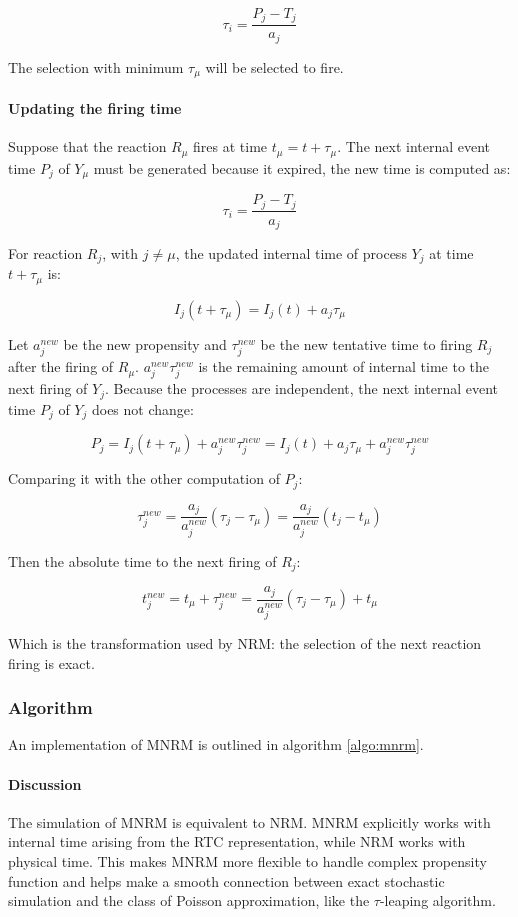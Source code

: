       $$\tau_i = \frac{P_j-T_j}{a_j}$$

      The selection with minimum $\tau_\mu$ will be selected to fire.

      \paragraph{Updating the firing time}
      Suppose that the reaction $R_\mu$ fires at time $t_\mu = t+\tau_\mu$.
      The next internal event time $P_j$ of $Y_\mu$ must be generated because it expired, the new time is computed as:

      $$\tau_i = \frac{P_j-T_j}{a_j}$$

      For reaction $R_j$, with $j\neq\mu$, the updated internal time of process $Y_j$ at time $t+\tau_\mu$ is:

      $$I_j(t+\tau_\mu) = I_j(t) + a_j\tau_\mu$$

      Let $a_j^{new}$ be the new propensity and $\tau_j^{new}$ be the new tentative time to firing $R_j$ after the firing of $R_\mu$.
      $a_j^{new}\tau_j^{new}$ is the remaining amount of internal time to the next firing of $Y_j$.
      Because the processes are independent, the next internal event time $P_j$ of $Y_j$ does not change:

      $$P_j = I_j(t+\tau_\mu) + a_j^{new}\tau_j^{new} = I_j(t) + a_j\tau_\mu + a_j^{new}\tau_j^{new}$$

      Comparing it with the other computation of $P_j$:

      $$\tau_j^{new} = \frac{a_j}{a_j^{new}}(\tau_j-\tau_\mu) = \frac{a_j}{a_j^{new}}(t_j-t_\mu)$$

      Then the absolute time to the next firing of $R_j$:

      $$t_j^{new} = t_\mu + \tau_j^{new} = \frac{a_j}{a_j^{new}}(\tau_j-\tau_\mu)+t_\mu$$

      Which is the transformation used by NRM: the selection of the next reaction firing is exact.

    \subsubsection{Algorithm}
    An implementation of MNRM is outlined in algorithm \ref{algo:mnrm}.

    

      \paragraph{Discussion}
      The simulation of MNRM is equivalent to NRM.
      MNRM explicitly works with internal time arising from the RTC representation, while NRM works with physical time.
      This makes MNRM more flexible to handle complex propensity function and helps make a smooth connection between exact stochastic simulation and the class of Poisson approximation, like the $\tau$-leaping algorithm.

